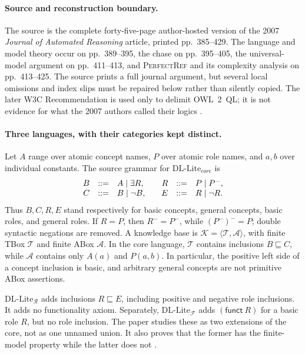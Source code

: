 \paragraph{Source and reconstruction boundary.}
The source is the complete forty-five-page author-hosted version of
the 2007 \emph{Journal of Automated Reasoning} article, printed pp.~385--429.
The language and model theory occur on pp.~389--395, the chase on
pp.~395--405, the universal-model argument on pp.~411--413, and
\textsc{PerfectRef} and its complexity analysis on pp.~413--425.  The source
prints a full journal argument, but several local omissions and index slips
must be repaired below rather than silently copied.  The later W3C
Recommendation is used only to delimit OWL~2~QL; it is not evidence for what
the 2007 authors called their logics \cite{CalvaneseEtAl2007}.

\paragraph{Three languages, with their categories kept distinct.}
Let \(A\) range over atomic concept names, \(P\) over atomic role names, and
\(a,b\) over individual constants.  The source grammar for
\(\mathrm{DL\mbox{-}Lite}_{core}\) is
\[
\begin{array}{rcl@{\qquad}rcl}
 B&::=&A\mid\exists R,&R&::=&P\mid P^{-},\\
 C&::=&B\mid\neg B,&E&::=&R\mid\neg R.
\end{array}
\]
Thus \(B,C,R,E\) stand respectively for basic concepts, general concepts,
basic roles, and general roles.  If \(R=P\), then \(R^{-}=P^{-}\), while
\((P^{-})^{-}=P\); double syntactic negations are removed.  A knowledge base is
\(\mathcal K=\langle\mathcal T,\mathcal A\rangle\), with finite TBox
\(\mathcal T\) and finite ABox \(\mathcal A\).  In the core language,
\(\mathcal T\) contains inclusions \(B\sqsubseteq C\), while \(\mathcal A\)
contains only \(A(a)\) and \(P(a,b)\).  In particular, the positive left side
of a concept inclusion is basic, and arbitrary general concepts are not
primitive ABox assertions.

\(\mathrm{DL\mbox{-}Lite}_{\mathcal R}\) adds inclusions \(R\sqsubseteq E\),
including positive and negative role inclusions.  It adds no functionality
axiom.  Separately, \(\mathrm{DL\mbox{-}Lite}_{\mathcal F}\) adds
\((\mathsf{funct}\ R)\) for a basic role \(R\), but no role inclusion.  The
paper studies these as two extensions of the core, not as one unnamed union.
It also proves that the former has the finite-model property while the latter
does not \cite[\S\S2.1--2.2]{CalvaneseEtAl2007}.

